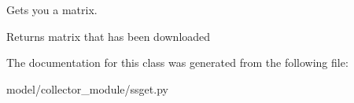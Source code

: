 Gets you a matrix. 

\begin{DoxyReturn}{Returns}
matrix that has been downloaded 
\end{DoxyReturn}


The documentation for this class was generated from the following file\+:\begin{DoxyCompactItemize}
\item 
model/collector\+\_\+module/ssget.\+py\end{DoxyCompactItemize}
